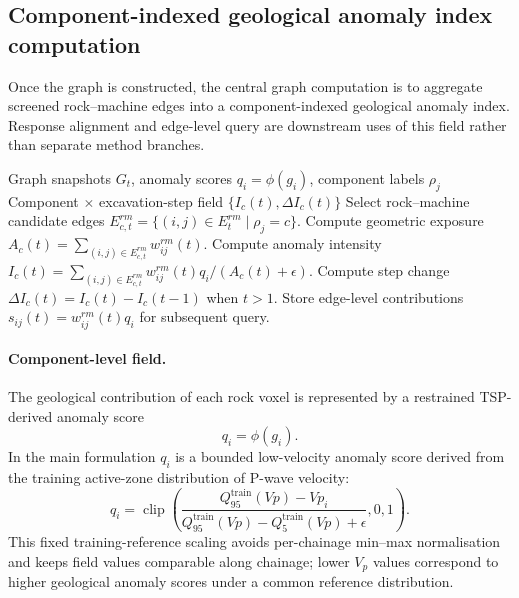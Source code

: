 \subsection{Component-indexed geological anomaly index computation}
\label{sec:interpretable_computation}
Once the graph is constructed, the central graph computation is to aggregate
screened rock--machine edges into a component-indexed geological anomaly index.
Response alignment and edge-level query are downstream uses of this
field rather than separate method branches.

\begin{algorithm}[htbp]
\caption{Component-indexed geological anomaly index computation}
\label{alg:interaction_field}
\begin{algorithmic}[1]
\REQUIRE Graph snapshots $G_t$, anomaly scores $q_i=\phi(g_i)$, component labels $\rho_j$
\ENSURE Component $\times$ excavation-step field $\{I_c(t),\Delta I_c(t)\}$
\STATE Select rock--machine candidate edges $E_{c,t}^{rm}=\{(i,j)\in E_t^{rm}\mid \rho_j=c\}$.
\STATE Compute geometric exposure $A_c(t)=\sum_{(i,j)\in E_{c,t}^{rm}}w_{ij}^{rm}(t)$.
\STATE Compute anomaly intensity $I_c(t)=\sum_{(i,j)\in E_{c,t}^{rm}}w_{ij}^{rm}(t)q_i/(A_c(t)+\epsilon)$.
\STATE Compute step change $\Delta I_c(t)=I_c(t)-I_c(t-1)$ when $t>1$.
\ENDFOR
\ENDFOR
\STATE Store edge-level contributions $s_{ij}(t)=w_{ij}^{rm}(t)q_i$ for subsequent query.
\end{algorithmic}
\end{algorithm}

\paragraph{Component-level field.} The geological contribution of each rock
voxel is represented by a restrained TSP-derived anomaly score
\[
q_i=\phi(g_i).
\]
In the main formulation $q_i$ is a bounded low-velocity anomaly score derived
from the training active-zone distribution of P-wave velocity:
\[
q_i=
\operatorname{clip}\left(
\frac{Q_{95}^{\mathrm{train}}(Vp)-Vp_i}
{Q_{95}^{\mathrm{train}}(Vp)-Q_{5}^{\mathrm{train}}(Vp)+\epsilon},
0,1
\right).
\]
This fixed training-reference scaling avoids per-chainage min--max
normalisation and keeps field values comparable along chainage; lower
$V_p$ values correspond to higher geological anomaly scores under a common
reference distribution.

